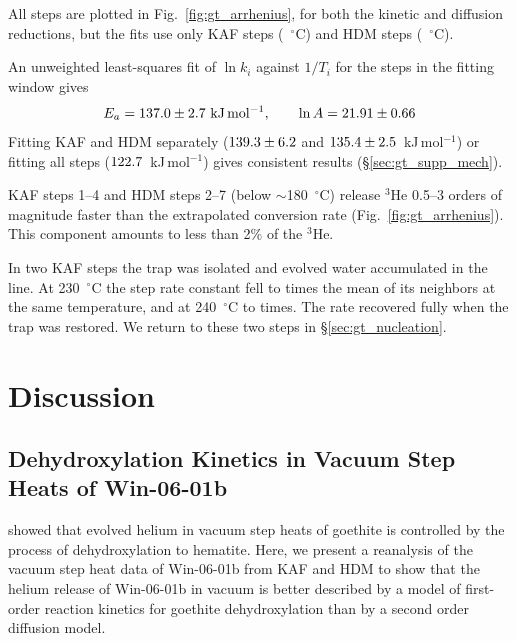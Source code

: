 All steps are plotted in Fig.~\ref{fig:gt_arrhenius}, for both the kinetic and diffusion reductions, but the fits use only KAF steps \ChTwoKinWinKAF{}
(\ChTwoKinWinKAFT~$^\circ$C) and HDM steps \ChTwoKinWinHDM{} (\ChTwoKinWinHDMT~$^\circ$C).

An unweighted least-squares fit of $\ln k_i$ against $1/T_i$ for the \ChTwoKinLineN{} steps in the fitting window
gives
\begin{equation}
  E_a = 137.0 \pm 2.7~\mathrm{kJ\,mol^{-1}},
  \qquad
  \ln A = 21.91 \pm 0.66
  \label{eq:gt_line}
\end{equation}
Fitting KAF and HDM separately ($139.3\pm6.2$ and $135.4\pm2.5$~kJ\,mol$^{-1}$)
or fitting all steps ($122.7$~kJ\,mol$^{-1}$) gives consistent results (\S\ref{sec:gt_supp_mech}).

KAF steps 1--4 and HDM steps 2--7
(below $\sim$180~$^\circ$C) release $^3$He 0.5--3 orders of magnitude faster than the extrapolated 
conversion rate (Fig.~\ref{fig:gt_arrhenius}). This component amounts
to less than 2\% of the $^3$He.

In two KAF steps the trap was isolated and evolved water accumulated in the line. At
230~$^\circ$C the step rate constant fell to \ChTwoKinTrapSuppLow{} times the mean of its neighbors at the same
temperature, and at 240~$^\circ$C to \ChTwoKinTrapSuppHigh{} times. The rate recovered fully when the trap was
restored. We return to these two steps in \S\ref{sec:gt_nucleation}.

\section{Discussion}\label{ch2-discussion}

\subsection{Dehydroxylation Kinetics in Vacuum Step Heats of Win-06-01b}\label{sec:gt_vacuum}

\citet{farley2024} showed that evolved helium in vacuum step heats of goethite is controlled 
by the process of dehydroxylation to hematite. Here, we present a reanalysis of the vacuum step heat data of Win-06-01b 
from KAF and HDM to show that the helium release of Win-06-01b in vacuum is better described 
by a model of first-order reaction kinetics for goethite dehydroxylation than by a second order diffusion model.


